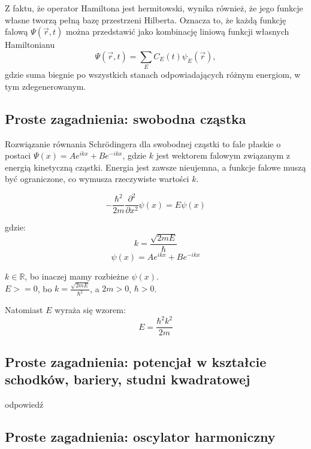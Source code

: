 \begin{itemize}
\begin{itemize}
{Z faktu, że operator Hamiltona jest hermitowski, wynika również, że jego funkcje własne tworzą pełną bazę przestrzeni Hilberta. Oznacza to, że każdą funkcję falową $\Psi(\vec{r}, t)$ można przedstawić jako kombinację liniową funkcji własnych Hamiltonianu
$$
\Psi(\vec{r}, t) = \sum_E C_E(t) \psi_E(\vec{r}),
$$
gdzie suma biegnie po wszystkich stanach odpowiadających różnym energiom, w tym zdegenerowanym.

\subsection{Proste zagadnienia: swobodna cząstka}

Rozwiązanie równania Schrödingera dla swobodnej cząstki to fale płaskie o postaci $\Psi(x) = A e^{ikx} + B e^{-ikx}$, gdzie
$k$ jest wektorem falowym związanym z energią kinetyczną cząstki. Energia jest zawsze nieujemna, a funkcje falowe muszą być
ograniczone, co wymusza rzeczywiste wartości $k$.


\begin{equation*}
    - \frac{\hbar^2}{2m} \frac{\partial^2}{\partial x^2} \psi(x) = E \psi(x)
\end{equation*}

gdzie:
\begin{equation*}
    k = \frac{\sqrt{2mE}}{\hbar}
\end{equation*}
%
\begin{equation*}
    \psi(x) = A e^{ikx} + B e^{-ikx}
\end{equation*}

$ k \in \mathbb{R} $, bo inaczej mamy rozbieżne $\psi(x)$. \\
$ E >= 0 $, bo $ k = \frac{\sqrt{2mE}}{\hbar^2} $, a $ 2m > 0 $, $ \hbar > 0 $.

Natomiast $E$ wyraża się wzorem:
\begin{equation*}
    E = \frac{\hbar^2 k^2}{2m}
\end{equation*}


\subsection{Proste zagadnienia: potencjał w kształcie schodków, bariery, studni kwadratowej}

odpowiedź

\subsection{Proste zagadnienia: oscylator harmoniczny}

}
\end{itemize}
\end{itemize}
